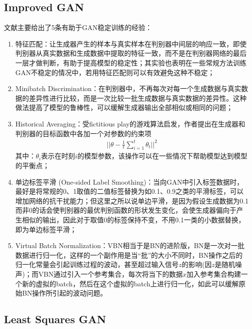     \subsection{Improved GAN}
        \par
        文献\cite{2016.Tim}主要给出了5条有助于GAN稳定训练的经验：
        \begin{enumerate}
        \item 特征匹配：让生成器产生的样本与真实样本在判别器中间层的响应一致，即使判别器从真实数据和生成数据中提取的特征一致，而不是在判别器网络的最后一层才做判断，有助于提高模型的稳定性；其实验也表明在一些常规方法训练GAN不稳定的情况中，若用特征匹配则可以有效避免这种不稳定；
        \item Minibatch Discrimination：在判别器中，不再每次对每一个生成数据与真实数据的差异性进行比较，而是一次比较一批生成数据与真实数据的差异性。这种做法提高了模型的鲁棒性，可以缓解生成器输出全部相似或相同的问题；
        \item Historical Averaging：受fictitious  play的游戏算法启发，作者提出在生成器和判别器的目标函数中各加一个对参数的约束项
        \begin{align*}
        \bigg|\bigg|\theta - \frac{1}{t}\sum_{i=1}^t\theta_t\bigg|\bigg|^2
        \end{align*}
        其中：$\theta_i$表示在时刻$i$的模型参数，该操作可以在一些情况下帮助模型达到模型的平衡点；
        \item 单边标签平滑 (One-sided Label Smoothing)：当向GAN中引入标签数据时，最好是将常规的0、1取值的二值标签替换为如0.1、0.9之类的平滑标签，可以增加网络的抗干扰能力；但这里之所以说单边平滑，是因为假设生成数据为0.1而非0的话会使判别器的最优判别函数的形状发生变化，会使生成器偏向于产生相似的输出，因此对于取值0的标签保持不变，不用0.1一类的小数据替换，即为单边标签平滑；
        \item Virtual Batch Normalization：VBN相当于是BN的进阶版，BN是一次对一批数据进行归一化，这样的一个副作用是当“批”的大小不同时，BN操作之后的归一化常量会引起训练过程的波动，甚至超过输入信号$z$的影响(因$z$是随机噪声)；而VBN通过引入一个参考集合，每次将当下的数据$x$加入参考集合构建一个新的虚拟的batch，然后在这个虚拟的batch上进行归一化，如此可以缓解原始BN操作所引起的波动问题。
        \end{enumerate}

    \subsection{Least Squares GAN}
